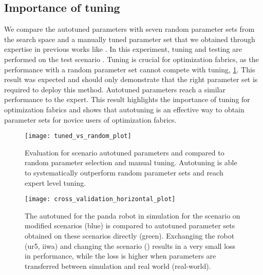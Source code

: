 \subsection{Importance of tuning}
\label{sub:importance_tuning}
%
We compare the autotuned parameters with seven random parameter sets from the
search space and a manually tuned parameter set that we obtained through
expertise in previous works like \cite{Spahn2023}.
%
In this experiment, tuning and testing are performed on the test scenario
\reachinginring{}. Tuning is crucial for optimization
fabrics, as the performance with a random parameter set cannot compete with
tuning, \cref{fig:results_manual_random_autotune}. This result was expected and
should only demonstrate that the right parameter set is required to deploy this
method. Autotuned parameters reach a similar performance to the expert. This
result highlights the importance of tuning for optimization fabrics and shows
that autotuning is an effective way to obtain parameter sets for novice users
of optimization fabrics.
%
\begin{figure}
    \centering
    \texttt{[image: tuned\_vs\_random\_plot]}
    \caption{Evaluation for scenario \reachinginring{} autotuned parameters and compared
        to random parameter selection and manual tuning. Autotuning is able to 
        systematically outperform random parameter sets and reach expert level tuning.}
    \label{fig:results_manual_random_autotune}
\end{figure}

\begin{figure}
    \centering
    \texttt{[image: cross\_validation\_horizontal\_plot]}
    \captionsetup{belowskip=-20pt}
    \caption{
        The autotuned for the panda robot in simulation for the
        \reachinginring{} scenario on modified scenarios (blue) is compared to
        autotuned parameter sets obtained on these scenarios directly (green).
        Exchanging the robot (ur5, iiwa) and changing the scenario
        (\reachingontable{}) results in a very small loss in performance, while
        the loss is higher when parameters are transferred between simulation
        and real world (real-world).
    }
    \label{fig:cross_evaluation}
\end{figure}
%
%
